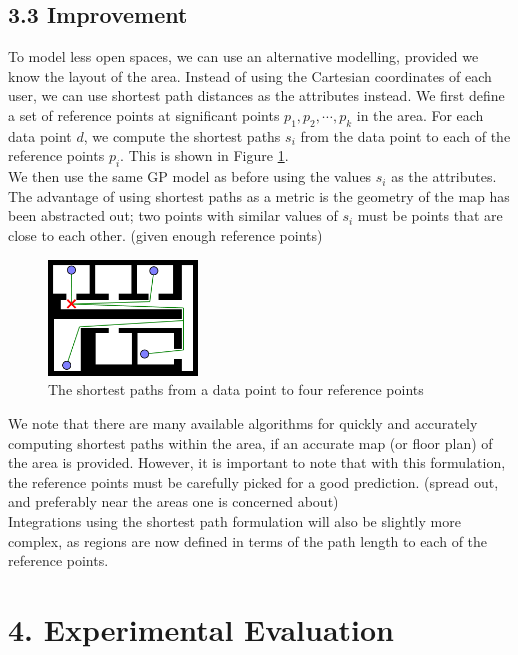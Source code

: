 \documentclass[letterpaper]{article}
\begin{document}
\subsection{3.3  Improvement}

To model less open spaces, we can use an alternative modelling, provided we know the layout of the area. Instead of using the Cartesian coordinates of each user, we can use shortest path distances as the attributes instead. We first define a set of reference points at significant points $p_1,p_2,\cdots,p_k$ in the area. For each data point $d$, we compute the shortest paths $s_i$ from the data point to each of the reference points $p_i$. This is shown in Figure \ref{fig:spaths}. \\

We then use the same GP model as before using the values $s_i$ as the attributes. The advantage of using shortest paths as a metric is the geometry of the map has been abstracted out; two points with similar values of $s_i$ must be points that are close to each other. (given enough reference points)

\begin{figure}[h!]
  \centering
    \includegraphics[width=150px,natwidth=570,natheight=442]{shortestpaths.png}
  \caption{The shortest paths from a data point to four reference points}
  \label{fig:spaths}
\end{figure}

We note that there are many available algorithms for quickly and accurately computing shortest paths within the area, if an accurate map (or floor plan) of the area is provided. However, it is important to note that with this formulation, the reference points must be carefully picked for a good prediction. (spread out, and preferably near the areas one is concerned about)\\

Integrations using the shortest path formulation will also be slightly more complex, as regions are now defined in terms of the path length to each of the reference points.

\section{4.  Experimental Evaluation}
\end{document}
